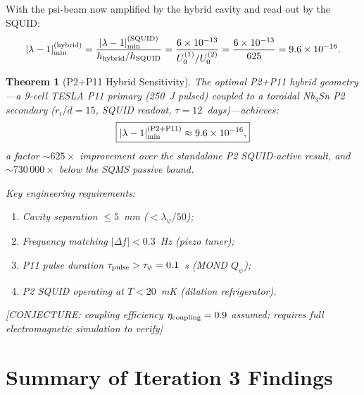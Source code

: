 \documentclass[11pt,twocolumn]{article}
\newcommand{\lam}{\lambda}
\newcommand{\ee}[1]{\times 10^{#1}}
\newtheorem{theorem}{Theorem}[section]
\theoremstyle{definition}
\theoremstyle{remark}
\begin{document}
With the psi-beam now amplified by the hybrid cavity and read out by the SQUID:
\begin{equation}
|\lam-1|_{\rm min}^{(\rm hybrid)}
= \frac{|\lam-1|_{\rm min}^{(\rm SQUID)}}{h_{\rm hybrid}/h_{\rm SQUID}}
= \frac{6\ee{-13}}{U_0^{(1)}/U_0^{(2)}}
= \frac{6\ee{-13}}{625}
= 9.6\ee{-16}.
\label{eq:lambda_hybrid}
\end{equation}

\begin{theorem}[P2+P11 Hybrid Sensitivity]
\label{thm:hybrid_sensitivity}
The optimal P2+P11 hybrid geometry---a 9-cell TESLA P11 primary (250~J
pulsed) coupled to a toroidal Nb$_3$Sn P2 secondary ($r_i/d = 15$,
SQUID readout, $\tau = 12$~days)---achieves:
\begin{equation}
\boxed{
|\lam-1|_{\rm min}^{(\rm P2+P11)} \approx 9.6\ee{-16},
}
\end{equation}
a factor $\sim 625\times$ improvement over the standalone P2 SQUID-active
result, and $\sim 730\,000\times$ below the SQMS passive bound.

Key engineering requirements:
\begin{enumerate}[nosep]
\item Cavity separation $\leq 5$~mm ($< \lambda_\psi/50$);
\item Frequency matching $|\Delta f| < 0.3$~Hz (piezo tuner);
\item P11 pulse duration $\tau_{\rm pulse} > \tau_\psi = 0.1$~s (MOND $Q_\psi$);
\item P2 SQUID operating at $T < 20$~mK (dilution refrigerator).
\end{enumerate}
[CONJECTURE: coupling efficiency $\eta_{\rm coupling} = 0.9$ assumed;
requires full electromagnetic simulation to verify]
\end{theorem}

\section{Summary of Iteration 3 Findings}
\label{sec:summary}
\end{document}
